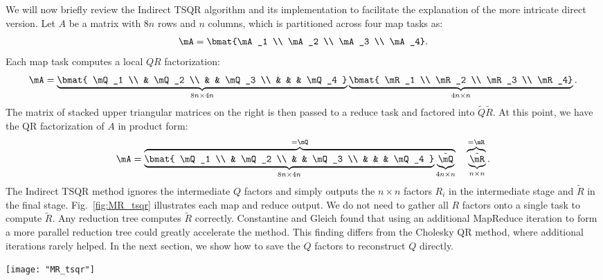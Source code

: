 \documentclass[10pt, conference, compsocconf]{IEEEtran}
\begin{document}
We will now briefly review the Indirect TSQR algorithm and its implementation to facilitate the explanation of the more intricate direct version.  Let $A$ be a matrix with $8n$ rows and $n$ columns, which is partitioned across four map tasks as:
\[ 
\mA = \bmat{\mA_1 \\ \mA_2 \\ \mA_3 \\ \mA_4}.
\]
Each map task computes a local $QR$ factorization:
\[ 
\mA = \underbrace{\bmat{ \mQ_1 \\ & \mQ_2 \\ & & \mQ_3 \\ & & & \mQ_4 }}_{8n \times 4n}
      \underbrace{\bmat{ \mR_1 \\ \mR_2 \\ \mR_3 \\ \mR_4}}_{4n \times n}.
\]
The matrix of stacked upper triangular matrices on the right is then passed to a reduce task and factored into $\tilde{Q}\tilde{R}$.  At this point, we have the QR factorization of $A$ in product form: 
\[ 
 \mA = \overbrace{\underbrace{\bmat{ \mQ_1 \\ & \mQ_2 \\ & & \mQ_3 \\ & & & \mQ_4 }}_{8n \times 4n}
       \underbrace{\tilde{\mQ}}_{4n \times n}}^{= \mQ} 
       \quad
       \overbrace{\vphantom{\bmat{ \mQ_1 \\ & \mQ_2 \\ & & \mQ_3 \\ & & & \mQ_4 }}\underbrace{\tilde{\mR}}_{n \times n}}^{= \mR}.
\]
The Indirect TSQR method ignores the intermediate $Q$ factors and simply outputs the $n \times n$ factors $R_i$ in the intermediate stage and $\tilde{R}$ in the final stage.  Fig.~\ref{fig:MR_tsqr} illustrates each map and reduce output.  We do not need to gather all $R$ factors onto a single task to compute $\tilde{R}$.  Any reduction tree computes $\tilde{R}$ correctly.  Constantine and Gleich found that using an additional MapReduce iteration to form a more parallel reduction tree could greatly accelerate the method. This finding differs from the Cholesky QR method, where additional iterations rarely helped. In the next section, we show how to save the $Q$ factors to reconstruct $Q$ directly.

\begin{figure*}
\centering
\texttt{[image: "MR\_tsqr"]}
\caption{MapReduce TSQR computation.  $S^{(1)}$ is the matrix consisting of the rows of the $R_i$ factors stacked on top of each other, $i = 1, 2, 3, 4$.  Similarly, $S^{(2)}$ is the matrix consisting of the rows of the $R_{2, j}$ factors stacked on top of each other, $j = 1, 2, 3$.}
\label{fig:MR_tsqr}
\end{figure*}
\end{document}
